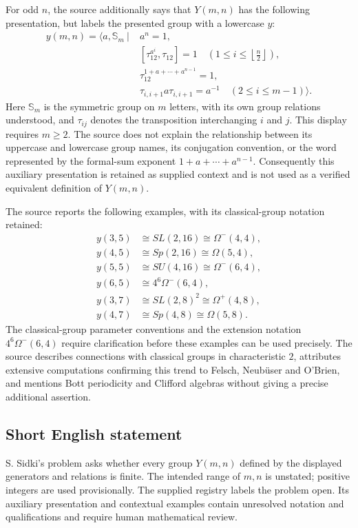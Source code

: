 \documentclass[11pt]{article}
\begin{document}
For odd \(n\), the source additionally says that \(Y(m,n)\) has the following presentation, but labels the presented group with a lowercase \(y\):
\[
\begin{aligned}
y(m,n)=\big\langle a,\mathbb S_m\ \big|\;&a^n=1,\\
&[\tau_{12}^{a^i},\tau_{12}]=1\quad\left(1\leq i\leq\left\lfloor\frac n2\right\rfloor\right),\\
&\tau_{12}^{1+a+\cdots+a^{n-1}}=1,\\
&\tau_{i,i+1}a\tau_{i,i+1}=a^{-1}\quad(2\leq i\leq m-1)\big\rangle.
\end{aligned}
\]
Here \(\mathbb S_m\) is the symmetric group on \(m\) letters, with its own group relations understood, and \(\tau_{ij}\) denotes the transposition interchanging \(i\) and \(j\). This display requires \(m\geq2\). The source does not explain the relationship between its uppercase and lowercase group names, its conjugation convention, or the word represented by the formal-sum exponent \(1+a+\cdots+a^{n-1}\). Consequently this auxiliary presentation is retained as supplied context and is not used as a verified equivalent definition of \(Y(m,n)\).

The source reports the following examples, with its classical-group notation retained:
\[
\begin{aligned}
y(3,5)&\cong SL(2,16)\cong\Omega^{-}(4,4),\\
y(4,5)&\cong Sp(2,16)\cong\Omega(5,4),\\
y(5,5)&\cong SU(4,16)\cong\Omega^{-}(6,4),\\
y(6,5)&\cong 4^6\Omega^{-}(6,4),\\
y(3,7)&\cong SL(2,8)^2\cong\Omega^{+}(4,8),\\
y(4,7)&\cong Sp(4,8)\cong\Omega(5,8).
\end{aligned}
\]
The classical-group parameter conventions and the extension notation \(4^6\Omega^{-}(6,4)\) require clarification before these examples can be used precisely. The source describes connections with classical groups in characteristic \(2\), attributes extensive computations confirming this trend to Felsch, Neub\"user and O'Brien, and mentions Bott periodicity and Clifford algebras without giving a precise additional assertion.
\subsection{Short English statement}
S. Sidki's problem asks whether every group \(Y(m,n)\) defined by the displayed generators and relations is finite. The intended range of \(m,n\) is unstated; positive integers are used provisionally. The supplied registry labels the problem open. Its auxiliary presentation and contextual examples contain unresolved notation and qualifications and require human mathematical review.
\end{document}

